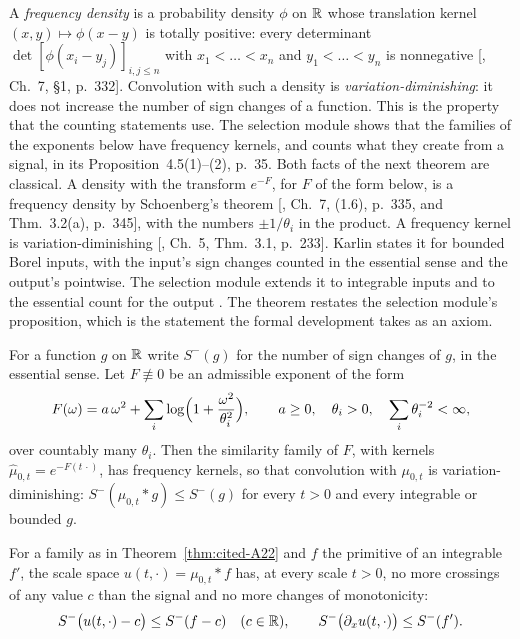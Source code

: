 A \emph{\Polya{} frequency density} is a probability density $\phi$ on $\mathbb{R}$ whose translation
kernel $(x, y) \mapsto \phi(x - y)$ is totally positive: every determinant
$\det[\phi(x_i - y_j)]_{i,j \le n}$ with $x_1 < \dots < x_n$ and $y_1 < \dots < y_n$ is
nonnegative [, Ch.~7, \S 1, p.~332]. Convolution with such a density is
\emph{variation-diminishing}: it does not increase the number of sign changes of a function. This
is the property that the counting statements use. The selection module shows that the families of
the exponents below have \Polya{} frequency kernels, and counts what they create from a signal, in
its Proposition~4.5(1)--(2), p.~35. Both facts of the next theorem are classical. A density with
the transform $e^{-F}$, for $F$ of the form below, is a \Polya{} frequency density by Schoenberg's
theorem [, Ch.~7, (1.6), p.~335, and Thm.~3.2(a), p.~345], with the numbers
$\pm1/\theta_i$ in the product. A \Polya{} frequency kernel is variation-diminishing
[, Ch.~5, Thm.~3.1, p.~233]. Karlin states it for bounded Borel inputs,
with the input's sign changes counted in the essential sense and the output's pointwise. The
selection module extends it to integrable inputs and to the essential count for the output
. The
theorem restates the selection module's proposition, which is the statement the formal development
takes as an axiom.

\begin{theorem}
\label{thm:cited-A22}

For a function $g$ on $\mathbb{R}$ write $S^-(g)$ for the number of sign changes of $g$, in the essential
sense.
Let $F \not\equiv 0$ be an admissible exponent of the form
\[
  F(\omega) = a\,\omega^2 + \sum_i\log\Bigl(1 + \frac{\omega^2}{\theta_i^2}\Bigr), \qquad
  a \ge 0,\quad \theta_i > 0,\quad \sum_i\theta_i^{-2} < \infty,
\]
over countably many $\theta_i$. Then the similarity family of $F$, with kernels
$\widehat\mu_{0,t} = e^{-F(t\,\cdot)}$, has \Polya{} frequency kernels, so that convolution with
$\mu_{0,t}$ is variation-diminishing: $S^-(\mu_{0,t} * g) \le S^-(g)$ for every $t > 0$ and every
integrable or bounded $g$.
\end{theorem}

\begin{theorem}
\label{thm:cited-A23}

For a family as in Theorem~\ref{thm:cited-A22} and $f$ the primitive of an integrable $f'$, the
scale space $u(t,\cdot) = \mu_{0,t} * f$ has, at every scale $t > 0$, no more crossings of any
value $c$ than the signal and no more changes of monotonicity:
\[
  S^-\bigl(u(t,\cdot) - c\bigr) \le S^-(f - c) \quad (c \in \mathbb{R}), \qquad
  S^-\bigl(\partial_x u(t,\cdot)\bigr) \le S^-(f').
\]
\end{theorem}

